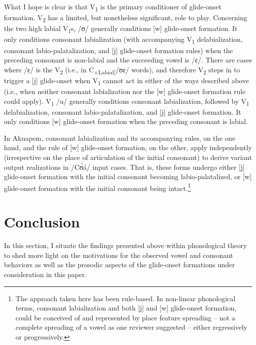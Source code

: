 \documentclass[output=paper,colorlinks,citecolor=brown]{langscibook}
\begin{document}
What I hope is clear is that V\textsubscript{1} is the primary conditioner of glide-onset formation. V\textsubscript{2} has a limited, but nonetheless significant, role to play. Concerning the two high labial V\textsubscript{1}s, /ʊ/ generally conditions [w] glide-onset formation. It only conditions consonant labialization (with accompanying V\textsubscript{1} delabialization, consonant labio-palatalization, and [j] glide-onset formation rules) when the preceding consonant is non-labial and the succeeding vowel is /ɛ/. There are cases where /ɛ/ is the V\textsubscript{2} (i.e., in C\textsubscript{+Labial]}/ʊɛ/ words), and therefore V\textsubscript{2} steps in to trigger a [j] glide-onset when V\textsubscript{1} cannot act in either of the ways described above (i.e., when neither consonant labialization nor the [w] glide-onset formation rule could apply). V\textsubscript{1} /u/ generally conditions consonant labialization, followed by V\textsubscript{1} delabialization, consonant labio-palatalization, and [j] glide-onset formation. It only conditions [w] glide-onset formation when the preceding consonant is labial. 

In  Akuapem, consonant labialization  and its accompanying rules, on the one hand, and the rule of [w] glide-onset formation, on the other, apply independently (irrespective on the place of articulation of the initial consonant) to derive variant output realizations in /Cʊ̀á/ input cases. That is, these forms undergo either [j] glide-onset formation with the initial consonant becoming labio-palatalized, or [w] glide-onset formation with the initial consonant being intact.\footnote{The approach taken here has been rule-based. In non-linear phonological terms, consonant labialization and both [j] and [w] glide-onset formation, could be conceived of and represented by place feature spreading – not a complete spreading of a vowel as one reviewer suggested – either regressively or progressively.}
  
\section{Conclusion} \label{02_Section4}

In this section, I situate the findings presented above within phonological theory to shed more light on the motivations for the observed vowel and consonant behaviors as well as the prosodic aspects of the glide-onset formations under consideration in this paper. 
\end{document}

